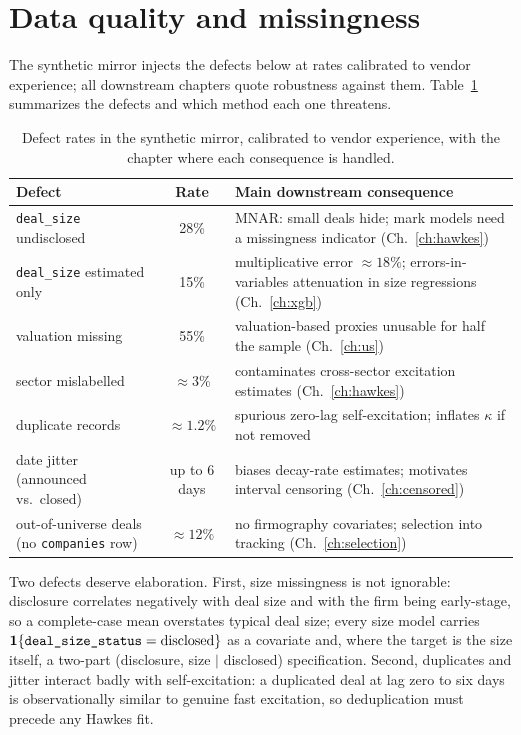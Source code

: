\section{Data quality and missingness}
\label{sec:data-quality}

The synthetic mirror injects the defects below at rates calibrated to vendor experience;
all downstream chapters quote robustness against them. Table~\ref{tab:data-quality}
summarizes the defects and which method each one threatens.

\begin{table}[htbp]
\centering
\small
\begin{tabular}{lcp{6.0cm}}
\toprule
Defect & Rate & Main downstream consequence \\
\midrule
\texttt{deal\_size} undisclosed & 28\% & MNAR: small deals hide; mark models need a
missingness indicator (Ch.~\ref{ch:hawkes}) \\
\texttt{deal\_size} estimated only & 15\% & multiplicative error $\approx 18\%$;
errors-in-variables attenuation in size regressions (Ch.~\ref{ch:xgb}) \\
valuation missing & 55\% & valuation-based proxies unusable for half the sample
(Ch.~\ref{ch:us}) \\
sector mislabelled & $\approx 3\%$ & contaminates cross-sector excitation estimates
(Ch.~\ref{ch:hawkes}) \\
duplicate records & $\approx 1.2\%$ & spurious zero-lag self-excitation; inflates
$\kappa$ if not removed \\
date jitter (announced vs.\ closed) & up to 6 days & biases decay-rate estimates;
motivates interval censoring (Ch.~\ref{ch:censored}) \\
out-of-universe deals (no \texttt{companies} row) & $\approx 12\%$ & no firmography
covariates; selection into tracking (Ch.~\ref{ch:selection}) \\
\bottomrule
\end{tabular}
\caption{Defect rates in the synthetic mirror, calibrated to vendor experience, with the
chapter where each consequence is handled.}
\label{tab:data-quality}
\end{table}

Two defects deserve elaboration. First, size missingness is not ignorable: disclosure
correlates negatively with deal size and with the firm being early-stage, so a
complete-case mean overstates typical deal size; every size model carries
$\mathbf{1}\{\texttt{deal\_size\_status} = \text{disclosed}\}$ as a covariate and, where the
target is the size itself, a two-part (disclosure, size $\mid$ disclosed) specification.
Second, duplicates and jitter interact badly with self-excitation: a duplicated deal at
lag zero to six days is observationally similar to genuine fast excitation, so
deduplication must precede any Hawkes fit.

